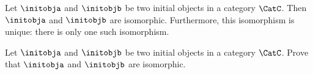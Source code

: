 

\begin{proposition}\label{prop:initial-objs-isom}
    Let $\initobja$ and $\initobjb$ be two initial objects in a category $\CatC$.
    Then $\initobja$ and $\initobjb$ are isomorphic. Furthermore, this isomorphism is unique: there is only one such isomorphism. 
\end{proposition}

\begin{gradedexercise}
    Let $\initobja$ and $\initobjb$ be two initial objects in a category $\CatC$.
    Prove that $\initobja$ and $\initobjb$ are isomorphic.
\end{gradedexercise}

